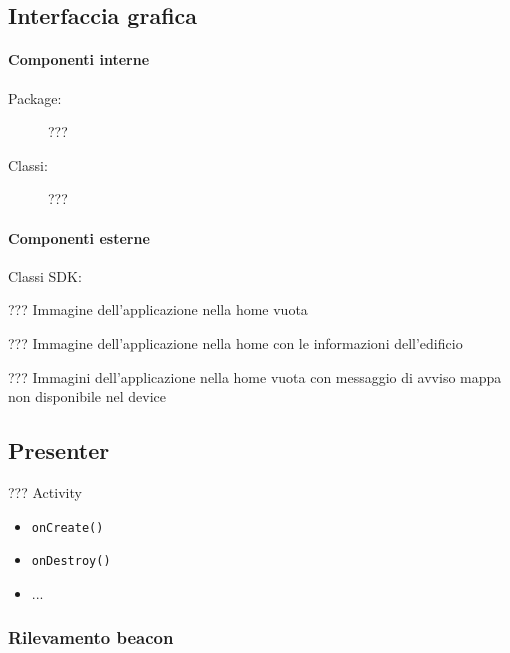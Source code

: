 \documentclass[../Funzionalita.tex]{subfiles}
\begin{document}
		\newpage
		\subsection{Interfaccia grafica}
		
			\paragraph*{Componenti interne}
			\begin{description}
				\item[Package:] ???
				\item[Classi:] ???
			\end{description}
			
			\paragraph*{Componenti esterne}
			\begin{description}
				\item[Classi SDK:] 
			\end{description}
			
			??? Immagine dell'applicazione nella home vuota
			
			??? Immagine dell'applicazione nella home con le informazioni dell'edificio
			
			??? Immagini dell'applicazione nella home vuota con messaggio di avviso mappa non disponibile nel device
			
		\subsection{Presenter}
		
			??? Activity
			
			\begin{itemize}[label={--}]
				\item \verb|onCreate()|
				\item \verb|onDestroy()|
				\item ...
			\end{itemize}
			
		\subsubsection{Rilevamento beacon}
			
\end{document}
